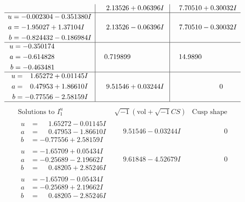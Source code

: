 \documentclass[1p]{elsarticle_modified}
\theoremstyle{definition}
\newcommand{\I}{\sqrt{-1}}
\begin{document}
$$\begin{array}{c|c|c}
 & \phantom{-}2.13526 + 0.06396 I & \phantom{-}7.70510 + 0.30032 I \\ \hline\begin{aligned}
u &= -0.002304 - 0.351380 I \\
a &= -1.95027 + 1.37104 I \\
b &= -0.824432 - 0.186984 I\end{aligned}
 & \phantom{-}2.13526 - 0.06396 I & \phantom{-}7.70510 - 0.30032 I \\ \hline\begin{aligned}
u &= -0.350174\phantom{ +0.000000I} \\
a &= -0.614828\phantom{ +0.000000I} \\
b &= -0.463481\phantom{ +0.000000I}\end{aligned}
 & \phantom{-}0.719899\phantom{ +0.000000I} & \phantom{-}14.9890\phantom{ +0.000000I} \\ \hline\begin{aligned}
u &= \phantom{-}1.65272 + 0.01145 I \\
a &= \phantom{-}0.47953 + 1.86610 I \\
b &= -0.77556 - 2.58159 I\end{aligned}
 & \phantom{-}9.51546 + 0.03244 I & \phantom{-0.000000 } 0\\
 \hline 
 \end{array}$$\newpage$$\begin{array}{c|c|c}  
\text{Solutions to }I^u_{1}& \I (\text{vol} + \sqrt{-1}CS) & \text{Cusp shape}\\
 \hline 
\begin{aligned}
u &= \phantom{-}1.65272 - 0.01145 I \\
a &= \phantom{-}0.47953 - 1.86610 I \\
b &= -0.77556 + 2.58159 I\end{aligned}
 & \phantom{-}9.51546 - 0.03244 I & \phantom{-0.000000 } 0 \\ \hline\begin{aligned}
u &= -1.65709 + 0.05434 I \\
a &= -0.25689 - 2.19662 I \\
b &= \phantom{-}0.48205 + 2.85246 I\end{aligned}
 & \phantom{-}9.61848 - 4.52679 I & \phantom{-0.000000 } 0 \\ \hline\begin{aligned}
u &= -1.65709 - 0.05434 I \\
a &= -0.25689 + 2.19662 I \\
b &= \phantom{-}0.48205 - 2.85246 I\end{aligned}

\end{array}$$
\end{document}
